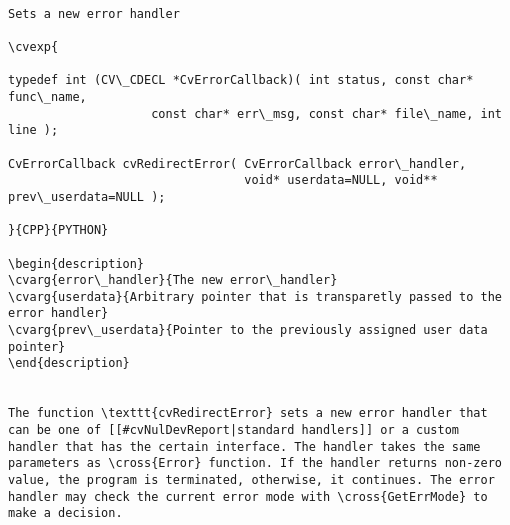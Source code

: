 \begin{verbatim}

Sets a new error handler

\cvexp{

typedef int (CV\_CDECL *CvErrorCallback)( int status, const char* func\_name,
                    const char* err\_msg, const char* file\_name, int line );

CvErrorCallback cvRedirectError( CvErrorCallback error\_handler,
                                 void* userdata=NULL, void** prev\_userdata=NULL );

}{CPP}{PYTHON}

\begin{description}
\cvarg{error\_handler}{The new error\_handler}
\cvarg{userdata}{Arbitrary pointer that is transparetly passed to the error handler}
\cvarg{prev\_userdata}{Pointer to the previously assigned user data pointer}
\end{description}


The function \texttt{cvRedirectError} sets a new error handler that can be one of [[#cvNulDevReport|standard handlers]] or a custom handler that has the certain interface. The handler takes the same parameters as \cross{Error} function. If the handler returns non-zero value, the program is terminated, otherwise, it continues. The error handler may check the current error mode with \cross{GetErrMode} to make a decision.


\end{verbatim}
